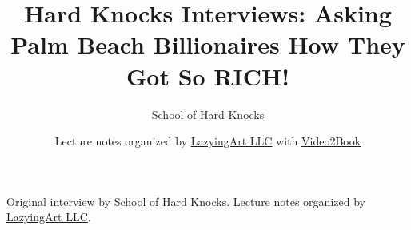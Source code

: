 \documentclass[11pt,oneside]{book}
\begin{document}
\frontmatter
\title{Hard Knocks Interviews: Asking Palm Beach Billionaires How They Got So RICH!}
\author{School of Hard Knocks}
\date{Lecture notes organized by \href{https://lazying.art}{LazyingArt LLC} with \href{https://github.com/lachlanchen/Video2Book}{Video2Book}}
\maketitle
\begin{center}
\small Original interview by School of Hard Knocks. Lecture notes organized by \href{https://lazying.art}{LazyingArt LLC}.
\end{center}
\clearpage
\mainmatter

\end{document}
